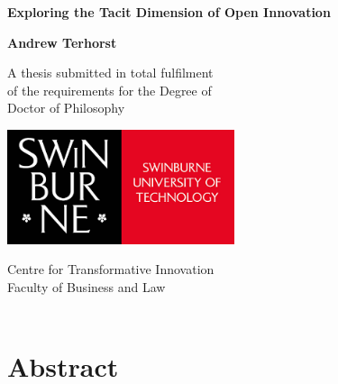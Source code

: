 \documentclass[12pt,table]{book}
\renewcommand{\today}{\the\day \ \monthname \ \the\year}
\begin{document}
\frontmatter

\begin{titlepage}
\renewcommand{\today}{\monthname \ \the\year}
\begin{center}
\vspace*{1cm}

\Huge
\textbf{Exploring the Tacit Dimension of Open Innovation}\\
\vspace{1cm}

\Large
\textbf{Andrew Terhorst}
\vfill

\Large
A thesis submitted in total fulfilment\\
of the requirements for the Degree of \\
Doctor of Philosophy

\vspace{1cm}

\includegraphics[width=0.5\textwidth]{Images/swinburne_university_of_technology.png} 

\vspace{1cm}

\Large
Centre for Transformative Innovation\\
Faculty of Business and Law\\
\today
\end{center}
\end{titlepage}

\doublespacing

\chapter*{Abstract}
\end{document}
